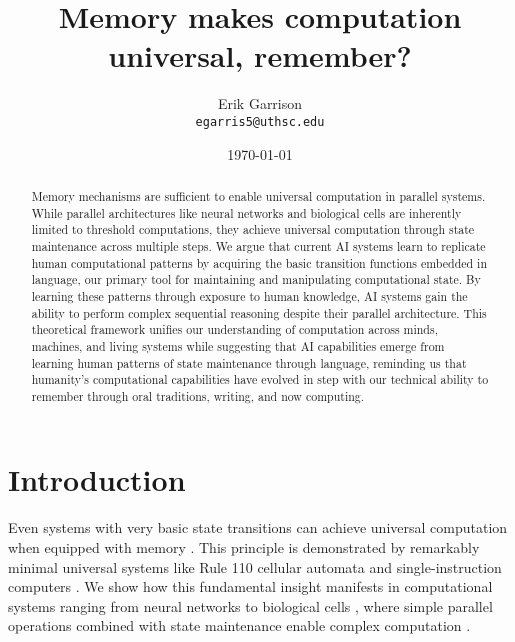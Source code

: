 \documentclass[12pt]{article}
\title{Memory makes computation universal, remember?}
\author{Erik Garrison\\
  \texttt{egarris5@uthsc.edu}\\[1ex]
  }
\date{\today}
\begin{document}
\maketitle

\begin{abstract}
Memory mechanisms are sufficient to enable universal computation in parallel systems.
While parallel architectures like neural networks and biological cells are inherently limited to threshold computations, they achieve universal computation through state maintenance across multiple steps.
We argue that current AI systems learn to replicate human computational patterns by acquiring the basic transition functions embedded in language, our primary tool for maintaining and manipulating computational state.
By learning these patterns through exposure to human knowledge, AI systems gain the ability to perform complex sequential reasoning despite their parallel architecture.
This theoretical framework unifies our understanding of computation across minds, machines, and living systems while suggesting that AI capabilities emerge from learning human patterns of state maintenance through language, reminding us that humanity's computational capabilities have evolved in step with our technical ability to remember through oral traditions, writing, and now computing.
\end{abstract}

\section{Introduction}
Even systems with very basic state transitions can achieve universal computation when equipped with memory \cite{merrill2023parallelism,peng2024limitations}.
This principle is demonstrated by remarkably minimal universal systems like Rule 110 cellular automata \cite{cook2004universality} and single-instruction computers \cite{savage1994space}.
We show how this fundamental insight manifests in computational systems ranging from neural networks to biological cells \cite{wang2023parallel}, where simple parallel operations combined with state maintenance enable complex computation \cite{swamy1983space,bisaz2024memory}.
\end{document}
